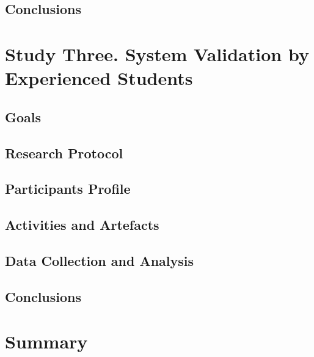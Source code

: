 \subsection{Conclusions}
 
\section{Study Three. System Validation by Experienced Students}
\subsection{Goals}
\subsection{Research Protocol}
\subsection{Participants Profile}
\subsection{Activities and Artefacts}
\subsection{Data Collection and Analysis}
\subsection{Conclusions}
 
\section{Summary}